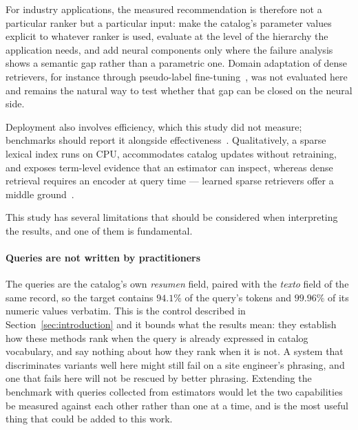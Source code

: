 \documentclass[preprint,review,12pt]{elsarticle}
\begin{document}
For industry applications, the measured recommendation is therefore not a particular ranker but a particular input: make the catalog's parameter values explicit to whatever ranker is used, evaluate at the level of the hierarchy the application needs, and add neural components only where the failure analysis shows a semantic gap rather than a parametric one. Domain adaptation of dense retrievers, for instance through pseudo-label fine-tuning~\cite{li2022domain}, was not evaluated here and remains the natural way to test whether that gap can be closed on the neural side.

Deployment also involves efficiency, which this study did not measure; benchmarks should report it alongside effectiveness~\cite{santhanam-etal-2023-moving}. Qualitatively, a sparse lexical index runs on CPU, accommodates catalog updates without retraining, and exposes term-level evidence that an estimator can inspect, whereas dense retrieval requires an encoder at query time --- learned sparse retrievers offer a middle ground~\cite{bruch2023analysis}.

This study has several limitations that should be considered when interpreting the results, and one of them is fundamental.

\paragraph{Queries are not written by practitioners} The queries are the catalog's own \textit{resumen} field, paired with the \textit{texto} field of the same record, so the target contains $94.1\%$ of the query's tokens and $99.96\%$ of its numeric values verbatim. This is the control described in Section~\ref{sec:introduction} and it bounds what the results mean: they establish how these methods rank when the query is already expressed in catalog vocabulary, and say nothing about how they rank when it is not. A system that discriminates variants well here might still fail on a site engineer's phrasing, and one that fails here will not be rescued by better phrasing. Extending the benchmark with queries collected from estimators would let the two capabilities be measured against each other rather than one at a time, and is the most useful thing that could be added to this work.
\end{document}
